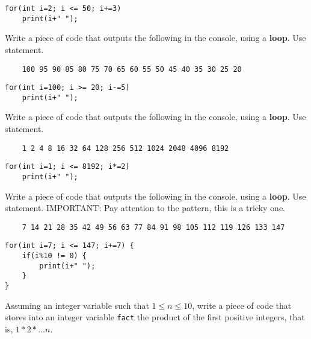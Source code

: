 \begin{questions}
\begin{solution}
\begin{lstlisting}
for(int i=2; i <= 50; i+=3)
	print(i+" ");	
\end{lstlisting}
\end{solution}

\question Write a piece of code that outputs the following in the console, using a \textbf{loop}. Use  statement.

\begin{verbatim}
	100 95 90 85 80 75 70 65 60 55 50 45 40 35 30 25 20
\end{verbatim}

\begin{solution}
\begin{lstlisting}
for(int i=100; i >= 20; i-=5)
	print(i+" ");	
\end{lstlisting}
\end{solution}

\question Write a piece of code that outputs the following in the console, using a \textbf{loop}. Use  statement.

\begin{verbatim}
	1 2 4 8 16 32 64 128 256 512 1024 2048 4096 8192
\end{verbatim}

\begin{solution}
\begin{lstlisting}
for(int i=1; i <= 8192; i*=2)
	print(i+" ");	
\end{lstlisting}
\end{solution}

\question Write a piece of code that outputs the following in the console, using a \textbf{loop}. Use  statement. \color{red}IMPORTANT: \color{black} Pay attention to the pattern, this is a tricky one.

\begin{verbatim}
	7 14 21 28 35 42 49 56 63 77 84 91 98 105 112 119 126 133 147
\end{verbatim}

\begin{solution}
\begin{lstlisting}
for(int i=7; i <= 147; i+=7) {
	if(i%10 != 0) {
		print(i+" ");
	}
}
\end{lstlisting}
\end{solution}


\question Assuming an integer variable  such that $1 \leq n \leq 10$, write a piece of code that stores into an integer variable \texttt{fact} the product of the first  positive integers, that is, $1 * 2 * \ldots n$.


\end{questions}
